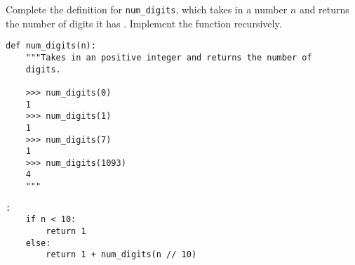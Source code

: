 \begin{blocksection}
\question Complete the definition for \texttt{num\_digits}, which takes in a number $n$ and returns the number of digits it has . Implement the function recursively.

\begin{lstlisting}
def num_digits(n):
    """Takes in an positive integer and returns the number of
    digits.

    >>> num_digits(0)
    1
    >>> num_digits(1)
    1
    >>> num_digits(7)
    1
    >>> num_digits(1093)
    4
    """
\end{lstlisting}

\begin{solution}[1in]
\begin{lstlisting}:
    if n < 10:
        return 1
    else:
        return 1 + num_digits(n // 10)
\end{lstlisting}
\end{solution}
\end{blocksection}
